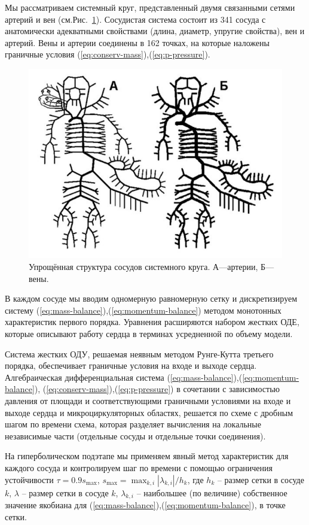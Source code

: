 Мы рассматриваем системный круг, представленный двумя связанными сетями артерий и вен (см.Рис.~\ref{ss}). 
Сосудистая система состоит из 341 сосуда с анатомически адекватными свойствами (длина, диаметр, упругие свойства), вен и артерий. 
Вены и артерии соединены в 162 точках, на которые наложены граничные условия (\ref{eq:conserv-mass}),(\ref{eq:p-pressure}). 

\begin{figure}[h]
\centering
\includegraphics[width=0.5\linewidth]{krug.png}
\caption{Упрощённая структура сосудов системного круга. А—артерии, Б—вены.}
\label{ss}
\end{figure}

В каждом сосуде мы вводим одномерную равномерную сетку и дискретизируем систему (\ref{eq:mass-balance}),(\ref{eq:momentum-balance}) 
методом монотонных характеристик первого порядка. Уравнения расширяются набором жестких ОДЕ, которые описывают работу сердца в терминах 
усредненной по объему модели.

Система жестких ОДУ, решаемая неявным методом Рунге-Кутта третьего порядка, обеспечивает граничные условия на входе и выходе сердца. 
Алгебраическая дифференциальная система (\ref{eq:mass-balance}),(\ref{eq:momentum-balance}), (\ref{eq:conserv-mass}),(\ref{eq:p-pressure}) 
в сочетании с зависимостью давления от площади и соответствующими граничными условиями на входе и выходе сердца 
и микроциркуляторных областях, решается по схеме с дробным шагом по времени схема, которая разделяет вычисления на 
локальные независимые части (отдельные сосуды и отдельные точки соединения).

На гиперболическом подэтапе мы применяем явный метод характеристик для каждого сосуда и контролируем шаг по времени с помощью 
ограничения устойчивости $\tau = 0.9 s_{\max}$, $s_{\max}=\max_{k,i}|\lambda _{k,i}|/h_k$, где $h_k$ -- размер сетки в сосуде $k$, 
$\lambda$ -- размер сетки в сосуде $k$,  $\lambda _{k,i}$ -- наибольшее (по величине) собственное значение якобиана для  (\ref{eq:mass-balance}),(\ref{eq:momentum-balance}), 
 в точке сетки.

